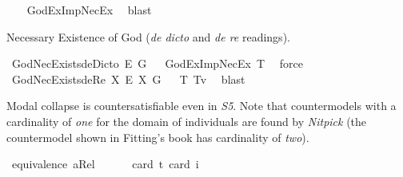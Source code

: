 \begin{isabellebody}
%
\ \ %
%
\isamarkupfalse%
\ GodExImpNecEx{}\ \isamarkupfalse%
\ blast%
%
%
%
\begin{isamarkuptext}%
Necessary Existence of God (\emph{de dicto} and \emph{de re} readings).%
\end{isamarkuptext}\isamarkuptrue%
\isamarkupfalse%
\ GodNecExists{\isacharunderscore}deDicto{\isacharcolon}\ {\isachardoublequoteopen}{\isasymlfloor}\isactrlbold {\isasymbox}\isactrlbold {\isasymexists}\isactrlsup E\ \isactrlbold {\isasymdown}G{\isasymrfloor}{\isachardoublequoteclose}%
\ %
%
\isamarkupfalse%
\ GodExImpNecEx{}\ T{}\ \isamarkupfalse%
\ force%
%
%
\isanewline
{}\isamarkupfalse%
\ GodNecExists{\isacharunderscore}deRe{\isacharcolon}\ {\isachardoublequoteopen}{\isasymlfloor}{\isacharparenleft}{\isasymlambda}X{\isachardot}\ \isactrlbold {\isasymbox}\isactrlbold {\isasymexists}\isactrlsup E\ X{\isacharparenright}\ \isactrlbold {\isasymdown}G{\isasymrfloor}{\isachardoublequoteclose}%
\ %
%
\isamarkupfalse%
\ T{}\ T{}v{}\ \isamarkupfalse%
\ blast%
%
%
%
\begin{isamarkuptext}%
Modal collapse is countersatisfiable even in \emph{S5}. Note that countermodels with a cardinality of \emph{one} 
for the domain of individuals are found by \emph{Nitpick} (the countermodel shown in Fitting's book has cardinality of \emph{two}).%
\end{isamarkuptext}\isamarkuptrue%
\isamarkupfalse%
\ {\isachardoublequoteopen}equivalence\ aRel\ {\isasymLongrightarrow}\ {\isasymlfloor}\isactrlbold {\isasymforall}{\isasymPhi}{\isachardot}{\isacharparenleft}{\isasymPhi}\ \isactrlbold {\isasymrightarrow}\ {\isacharparenleft}\isactrlbold {\isasymbox}\ {\isasymPhi}{\isacharparenright}{\isacharparenright}{\isasymrfloor}{\isachardoublequoteclose}\ \isamarkupfalse%
{\isacharbrackleft}card\ {\isacharprime}t{\isacharequal}{}{\isacharcomma}\ card\ i{\isacharequal}{}{\isacharbrackright}%
\ %
%
\isamarkupfalse%
\ %
%
%
%
%
%
%
%
%
%
\end{isabellebody}%
